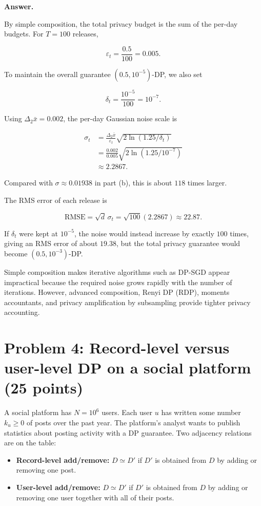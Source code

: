 \documentclass[11pt]{article}
\newcommand{\eps}{\varepsilon}
\newenvironment{answer}{\par\medskip\noindent\textbf{Answer.}\ }{\par\bigskip}
\newcommand{\problem}[2]{\section*{#1 \hfill\normalsize(#2)}}
\begin{document}
\begin{enumerate}
\begin{answer}

By simple composition, the total privacy
budget is the sum of the per-day budgets.
For $T=100$ releases,

\[
\eps_t=\frac{0.5}{100}=0.005.
\]

To maintain the overall guarantee
$(0.5,10^{-5})$-DP, we also set

\[
\delta_t=\frac{10^{-5}}{100}=10^{-7}.
\]

Using $\Delta_2\bar{x}=0.002$, the
per-day Gaussian noise scale is

\[
\begin{aligned}
\sigma_t
&=\frac{\Delta_2\bar{x}}{\eps_t}
\sqrt{2\ln(1.25/\delta_t)}\\
&=\frac{0.002}{0.005}
\sqrt{2\ln(1.25/10^{-7})}\\
&\approx 2.2867.
\end{aligned}
\]

Compared with $\sigma\approx0.01938$
in part (b), this is about $118$ times
larger.

The RMS error of each release is

\[
\mathrm{RMSE}
=\sqrt{d}\,\sigma_t
=\sqrt{100}(2.2867)
\approx22.87.
\]

If $\delta_t$ were kept at $10^{-5}$,
the noise would instead increase by
exactly $100$ times, giving an RMS
error of about $19.38$, but the total
privacy guarantee would become
$(0.5,10^{-3})$-DP.

Simple composition makes iterative
algorithms such as DP-SGD appear impractical
because the required noise grows rapidly
with the number of iterations. However,
advanced composition, Renyi DP (RDP),
moments accountants, and privacy
amplification by subsampling provide
tighter privacy accounting.

\end{answer}

\end{enumerate}

\problem{Problem 4: Record-level versus user-level DP on a social platform}{25 points}

A social platform has $N=10^6$ users. Each user $u$ has written some number
$k_u\ge0$ of posts over the past year. The platform's analyst wants to publish
statistics about posting activity with a DP guarantee. Two adjacency relations
are on the table:
\begin{itemize}
  \item \textbf{Record-level add/remove:} $D\simeq D'$ if $D'$ is obtained
  from $D$ by adding or removing one post.
  \item \textbf{User-level add/remove:} $D\simeq D'$ if $D'$ is obtained from
  $D$ by adding or removing one user together with all of their posts.
\end{itemize}
\end{document}
